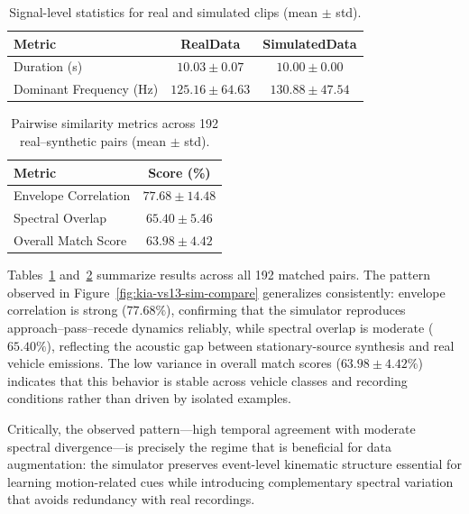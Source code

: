 \documentclass{article}
\begin{document}
\begin{table}[H]
\centering
\caption{Signal-level statistics for real and simulated clips (mean $\pm$ std).}
\label{tab:signal_stats}
\renewcommand{\arraystretch}{1.2}
\begin{tabular}{lcc}
\toprule
\textbf{Metric} & \textbf{RealData} & \textbf{SimulatedData} \\
\midrule
Duration (s) & $10.03 \pm 0.07$ & $10.00 \pm 0.00$ \\
Dominant Frequency (Hz) & $125.16 \pm 64.63$ & $130.88 \pm 47.54$ \\
\bottomrule
\end{tabular}
\end{table}

\begin{table}[H]
\centering
\caption{Pairwise similarity metrics across 192 real--synthetic pairs (mean $\pm$ std).}
\label{tab:pairwise_stats}
\renewcommand{\arraystretch}{1.2}
\begin{tabular}{lc}
\toprule
\textbf{Metric} & \textbf{Score (\%)} \\
\midrule
Envelope Correlation & $77.68 \pm 14.48$ \\
Spectral Overlap & $65.40 \pm 5.46$ \\
Overall Match Score & $63.98 \pm 4.42$ \\
\bottomrule
\end{tabular}
\end{table}

Tables~\ref{tab:signal_stats} and~\ref{tab:pairwise_stats} summarize results across all 192 matched pairs. The pattern observed in Figure~\ref{fig:kia-vs13-sim-compare} generalizes consistently: envelope correlation is strong ($77.68\%$), confirming that the simulator reproduces approach--pass--recede dynamics reliably, while spectral overlap is moderate ($65.40\%$), reflecting the acoustic gap between stationary-source synthesis and real vehicle emissions. The low variance in overall match scores ($63.98 \pm 4.42\%$) indicates that this behavior is stable across vehicle classes and recording conditions rather than driven by isolated examples.

Critically, the observed pattern---high temporal agreement with moderate spectral divergence---is precisely the regime that is beneficial for data augmentation: the simulator preserves event-level kinematic structure essential for learning motion-related cues while introducing complementary spectral variation that avoids redundancy with real recordings.
\end{document}
